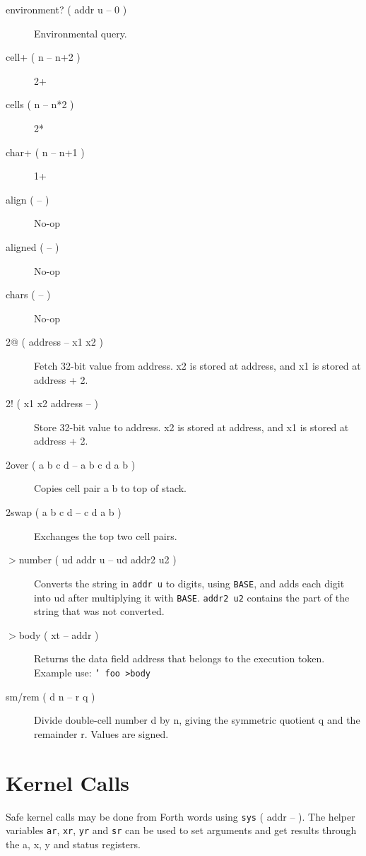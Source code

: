 \begin{description}
    \item[environment? ( addr u -- 0 )] Environmental query.
    \item[cell+ ( n -- n+2 )] 2+
    \item[cells ( n -- n*2 )] 2*
    \item[char+ ( n -- n+1 )] 1+
    \item[align ( -- )] No-op
    \item[aligned ( -- )] No-op
    \item[chars ( -- )] No-op
    \item[2@ ( address -- x1 x2 )] Fetch 32-bit value from address. x2 is stored at address, and x1 is stored at address + 2.
    \item[2! ( x1 x2 address -- )] Store 32-bit value to address. x2 is stored at address, and x1 is stored at address + 2.
    \item[2over ( a b c d -- a b c d a b )] Copies cell pair a b to top of stack.
    \item[2swap ( a b c d -- c d a b )] Exchanges the top two cell pairs.
    \item[$>$number ( ud addr u -- ud addr2 u2 )] Converts the string in \texttt{addr u} to digits, using \texttt{BASE}, and adds each digit into ud after multiplying it with \texttt{BASE}. \texttt{addr2 u2} contains the part of the string that was not converted.
    \item[$>$body ( xt -- addr )] Returns the data field address that belongs to the execution token. Example use: \texttt{' foo >body}
    \item[sm/rem ( d n -- r q )] Divide double-cell number d by n, giving the symmetric quotient q and the remainder r. Values are signed.

\end{description}

\section{Kernel Calls}

Safe kernel calls may be done from Forth words using \texttt{sys} ( addr -- ). The helper variables \texttt{ar}, \texttt{xr}, \texttt{yr} and \texttt{sr} can be used to set arguments and get results through the a, x, y and status registers.

